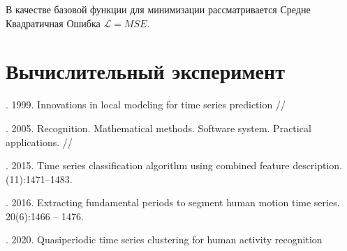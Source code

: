 \documentclass[12pt, twoside]{article}
\begin{document}
В качестве базовой функции для минимизации рассматривается Средне Квадратичная Ошибка $\mathscr{L} = MSE$.


\section{Вычислительный эксперимент}






\maketitleSecondary
\English
\begin{thebibliography}{99}

    . 1999.
    Innovations in local modeling for time series prediction // 
    
    . 2005.
    Recognition. Mathematical methods. Software system. Practical applications. // 

	. 2015.
	 Time series classification algorithm using combined feature description.
	 (11):1471–1483.

	. 2016.
	 Extracting fundamental periods to segment human motion time series.
	  20(6):1466 – 1476.
    
	. 2020.
	Quasiperiodic time series clustering for human activity recognition
	
\printbibliography
  	     	
\end{thebibliography}
\end{document}
